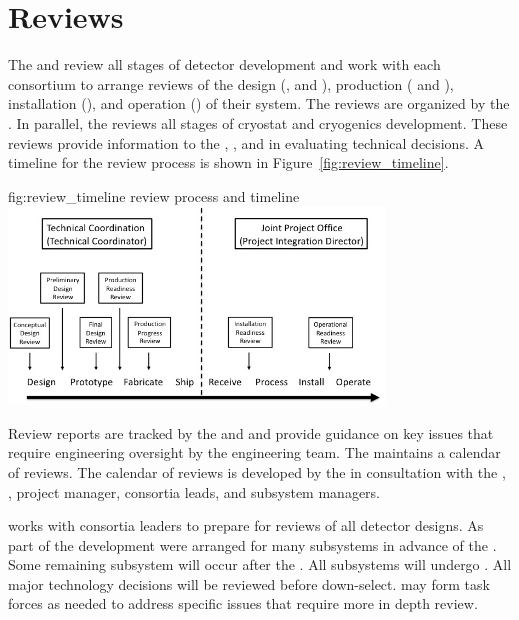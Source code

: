 \chapter{Reviews}
\label{vl:tc-review}

The  and  review all stages of detector development
and work with each consortium to arrange reviews of the design
(,  and ), production (
and ), installation (), and operation
() of their system. The reviews are organized by the
 . In parallel, the   reviews all
stages of  cryostat and cryogenics development.  These
reviews provide information to the , , and 
in evaluating technical decisions. A timeline for the review process
is shown in Figure~\ref{fig:review_timeline}.
\begin{dunefigure}{fig:review_timeline}
  { review process and timeline}
  \includegraphics[width=0.75\textwidth]{graphics/review_timeline}
\end{dunefigure}
Review reports are tracked by the   and  and provide
guidance on key issues that require engineering oversight by the
 engineering team. The   maintains a
calendar of  reviews. The calendar of reviews is developed
by the   in consultation with the ,
,  project manager, consortia leads, and
 subsystem managers.

 works with consortia leaders to prepare for reviews of all detector
designs.  As part of the  development  were
arranged for many subsystems in advance of the . Some
remaining subsystem  will occur after the . All
subsystems will undergo .  All major technology decisions
will be reviewed before down-select.   may form task forces
as needed to address specific issues that require more in depth
review.


